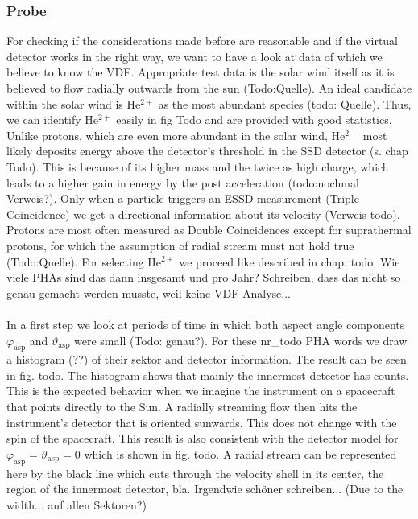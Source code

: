 \subsubsection{Probe}
For checking if the considerations made before are reasonable and if the virtual detector works in the right way, we want to have a look at data of which we believe to know the VDF. Appropriate test data is the solar wind itself as it is believed to flow radially outwards from the sun (Todo:Quelle). An ideal candidate within the solar wind is $\mathrm{He^{2+}}$ as the most abundant species (todo: Quelle). Thus, we can identify $\mathrm{He^{2+}}$ easily in fig Todo and are provided with good statistics. Unlike protons, which are even more abundant in the solar wind, $\mathrm{He^{2+}}$ most likely deposits energy above the detector's threshold in the SSD detector (s. chap Todo). This is because of its higher mass and the twice as high charge, which leads to a higher gain in energy by the post acceleration (todo:nochmal Verweis?). Only when a particle triggers an ESSD measurement (Triple Coincidence) we get a directional information about its velocity (Verweis todo). Protons are most often measured as Double Coincidences except for suprathermal protons, for which the assumption of radial stream must not hold true (Todo:Quelle). For selecting $\mathrm{He^{2+}}$ we proceed like described in chap. todo.
Wie viele PHAs sind das dann insgesamt und pro Jahr? Schreiben, dass das nicht so genau gemacht werden musste, weil keine VDF Analyse...
\\ \\
In a first step we look at periods of time in which both aspect angle components $\varphi_{\mathrm{asp}}$ and $\vartheta_{\mathrm{asp}}$ were small (Todo: genau?). For these nr\_todo PHA words we draw a histogram (??) of their sektor and detector information. The result can be seen in fig. todo. The histogram shows that mainly the innermost detector has counts. This is the expected behavior when we imagine the instrument on a spacecraft that points directly to the Sun. A radially streaming flow then hits the instrument's detector that is oriented sunwards. This does not change with the spin of the spacecraft. This result is also consistent with the detector model for $\varphi_{\mathrm{asp}} = \vartheta_{\mathrm{asp}} = 0$ which is shown in fig. todo. A radial stream can be represented here by the black line which cuts through the velocity shell in its center, the region of the innermost detector, bla. Irgendwie schöner schreiben...
(Due to the width... auf allen Sektoren?)
